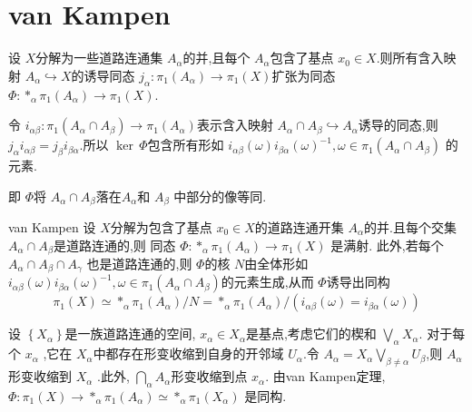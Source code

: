 \documentclass[../../几何与拓扑.tex]{subfiles}
\begin{document}
\section{van Kampen}

\begin{lemma}
    设 \(  X  \)分解为一些道路连通集 \(  A_{\alpha }  \)的并,且每个 \(  A_{\alpha }  \)包含了基点 \(  x_0 \in X  \).则所有含入映射 \(  A_{\alpha }\hookrightarrow X  \)的诱导同态 \(  j_{\alpha }:\pi _1 \left( A_{\alpha } \right)\to \pi _1 \left( X \right)    \)扩张为同态 \(  \Phi : *_{\alpha } \pi _1 \left( A_{\alpha } \right)\to \pi _1 \left( X \right)    \).      
\end{lemma}

\begin{proposition}
    令 \(  i_{\alpha \beta }:\pi _1 \left( A_{\alpha }\cap A_{\beta } \right)\to \pi _1 \left( A_{\alpha } \right)    \)表示含入映射 \(  A_{\alpha }\cap A_{\beta }\hookrightarrow A_{\alpha }  \)诱导的同态,则 \(  j_{\alpha }i_{\alpha \beta }= j_{\beta }i_{\beta \alpha }  \).所以 \(  \operatorname{ker}\,\Phi   \)包含所有形如 \(  i_{\alpha \beta }\left(  \omega  \right)i_{\beta \alpha }\left(  \omega  \right)^{-1} , \omega \in \pi _1 \left( A_{\alpha }\cap A_{\beta } \right)     \)     的元素.
\end{proposition}
\begin{note}
    即 \(  \Phi   \)将 \(  A_{\alpha }\cap A_{\beta }  \)落在\(  A_{\alpha }  \)和 \(  A_{\beta }  \)    中部分的像等同.
\end{note}

\begin{theorem}{van Kampen}
    设 \(  X  \)分解为包含了基点 \(  x_0 \in X  \)的道路连通开集 \(  A_{\alpha }  \)的并.且每个交集 \(  A_{\alpha }\cap A_{\beta }  \)是道路连通的,则 同态 \(  \Phi : *_{\alpha }\pi _1 \left( A_{\alpha } \right)\to \pi _1 \left( X \right)    \)  是满射. 此外,若每个 \(  A_{\alpha }\cap A_{\beta }\cap A_{ \gamma }  \) 也是道路连通的,则 \(  \Phi   \)的核 \(  N  \)由全体形如 \(  i_{\alpha \beta }\left(  \omega  \right)i_{\beta \alpha }\left(  \omega  \right)^{-1} , \omega \in \pi _1 \left( A_{\alpha }\cap A_{\beta } \right)     \)的元素生成,从而 \(  \Phi   \)诱导出同构\[
    \pi _1 \left( X \right)\simeq *_{\alpha }\pi _1 \left( A_{\alpha } \right) / N=  *_{\alpha }\pi _1 \left( A_{\alpha } \right)/ \left( i_{\alpha \beta }\left(  \omega  \right)= i_{\beta \alpha }\left(  \omega  \right)   \right)    
    \]    
\end{theorem}

\begin{example}
    设 \(  \left\{ X_{\alpha } \right\}  \)是一族道路连通的空间, \(  x_{\alpha } \in X_{\alpha }  \)是基点,考虑它们的楔和 \(\bigvee  _{\alpha }X_{\alpha }  \).    对于每个 \(  x_{\alpha }  \)  ,它在 \(  X_{\alpha }  \)中都存在形变收缩到自身的开邻域 \(  U_{\alpha }  \).令 \(  A_{\alpha }= X_{\alpha } \bigvee _{\beta \neq \alpha }U_{\beta }  \),则 \(  A_{\alpha }  \)形变收缩到 \(  X_{\alpha }  \)  .此外, \(  \bigcap_{\alpha }A_{\alpha }   \)形变收缩到点 \(  x_{\alpha }  \).  由van Kampen定理,  \(  \Phi :\pi _1 \left( X \right)\to *_{\alpha }\pi _1 \left( A_{\alpha } \right)\simeq *_{\alpha }\pi _1 \left( X_{\alpha } \right)     \)  是同构.
\end{example}

\hspace*{\fill} 
\end{document}
